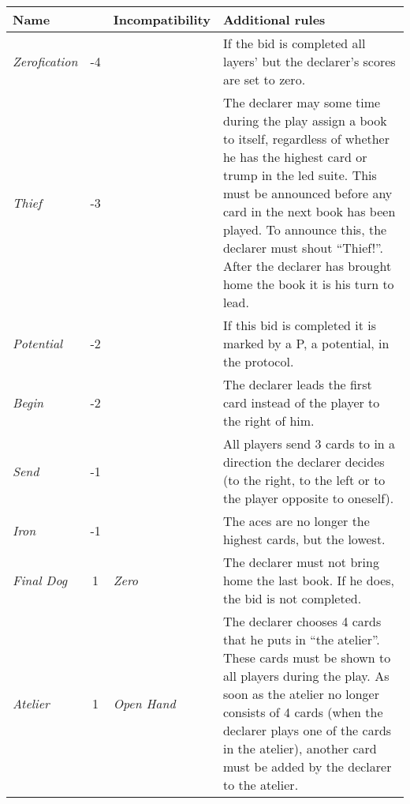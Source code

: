 \begin{table}
	\begin{center}
		\footnotesize {
			\begin{tabularx}{\textwidth}{ lcX | p{6cm} }
					\textbf{Name} & \rotccw{\textbf{Worth}} & {\textbf{Incompatibility}} & \textbf{Additional rules}
					\\ \hline
					
					\textit{Zerofication} & -4 &
					&
					If the bid is completed all layers' but the declarer's scores are set to zero.
					\\ \hline
					
					\textit{Thief} & -3 &
					&
					The declarer may some time during the play assign a book to itself, regardless of whether he has the highest card or trump in the led suite. This must be announced before any card in the next book has been played. To announce this, the declarer must shout ``Thief!''. After the declarer has brought home the book it is his turn to lead.
					\\ \hline
					
					\textit{Potential} & -2 &
					&
					If this bid is completed it is marked by a P, a potential, in the protocol.
					\\ \hline
					
					\textit{Begin} & -2 &
					&
					The declarer leads the first card instead of the player to the right of him.
					\\ \hline
					
					\textit{Send} & -1 &
					&
					All players send 3 cards to in a direction the declarer decides (to the right, to the left or to the player opposite to oneself).
					\\ \hline
					
					\textit{Iron} & -1 &
					&
					The aces are no longer the highest cards, but the lowest.
					\\ \hline
					
					\textit{Final Dog} & 1 &
					\textit{Zero} &
					The declarer must not bring home the last book. If he does, the bid is not completed.
					\\ \hline
					
					\textit{Atelier} & 1 &
					\textit{Open Hand} &
					The declarer chooses 4 cards that he puts in ``the atelier''. These cards must be shown to all players during the play. As soon as the atelier no longer consists of 4 cards (when the declarer plays one of the cards in the atelier), another card must be added by the declarer to the atelier.
					\\ \hline
					

\end{tabularx}}
\end{center}
\end{table}
